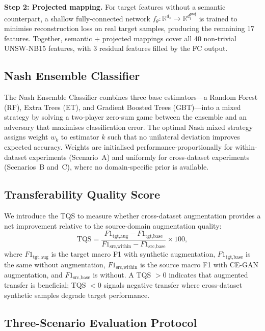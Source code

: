 \documentclass[conference]{IEEEtran}
\begin{document}
\textbf{Step 2: Projected mapping.}
For target features without a semantic counterpart, a shallow
fully-connected network $f_\theta: \mathbb{R}^{d_s} \to \mathbb{R}^{d_t^{\text{proj}}}$
is trained to minimise reconstruction loss on real target samples,
producing the remaining 17 features.
Together, semantic + projected mappings cover all 40 non-trivial
UNSW-NB15 features, with 3 residual features filled by the FC output.

\subsection{Nash Ensemble Classifier}

The Nash Ensemble Classifier combines three base estimators---a Random
Forest (RF), Extra Trees (ET), and Gradient Boosted Trees (GBT)---into
a mixed strategy by solving a two-player zero-sum game between the
ensemble and an adversary that maximises classification error.
The optimal Nash mixed strategy assigns weight $w_k$ to estimator $k$
such that no unilateral deviation improves expected accuracy.
Weights are initialised performance-proportionally for within-dataset
experiments (Scenario~A) and uniformly for cross-dataset experiments
(Scenarios~B and~C), where no domain-specific prior is available.

\subsection{Transferability Quality Score}

We introduce the TQS to measure whether cross-dataset augmentation
provides a net improvement relative to the source-domain augmentation
quality:
\begin{equation}
  \text{TQS} =
    \frac{F1_{\text{tgt,aug}} - F1_{\text{tgt,base}}}
         {F1_{\text{src,within}} - F1_{\text{src,base}}}
    \times 100,
  \label{eq:tqs}
\end{equation}
where $F1_{\text{tgt,aug}}$ is the target macro F1 with synthetic
augmentation, $F1_{\text{tgt,base}}$ is the same without augmentation,
$F1_{\text{src,within}}$ is the source macro F1 with CE-GAN augmentation,
and $F1_{\text{src,base}}$ is without.
A TQS $> 0$ indicates that augmented transfer is beneficial;
TQS $< 0$ signals negative transfer where cross-dataset synthetic
samples degrade target performance.

\subsection{Three-Scenario Evaluation Protocol}
\end{document}
